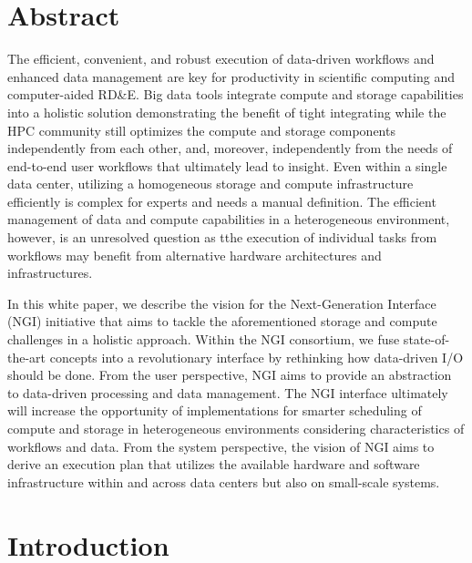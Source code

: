 \documentclass[a4paper, twocolumn]{article}
\title{\papertitle}
\author{Julian M. Kunkel
  \textit{University of Reading}
	\and
  Chris Hoffman
  \textit{National Center for Atmospheric Research}
  \and
  Andy Poling
  \textit{Kove}
  \and
  C
}
\date{\today}
\begin{document}
\maketitle
\thispagestyle{fancy}

\section*{Abstract}

The efficient, convenient, and robust execution of data-driven workflows and enhanced data management are key for productivity in scientific computing and computer-aided RD\&E.
Big data tools integrate compute and storage capabilities into a holistic solution demonstrating the benefit of tight integrating while the HPC community still optimizes the compute and storage components independently from each other, and, moreover, independently from the needs of end-to-end user workflows  that ultimately lead to insight.
Even within a single data center, utilizing a homogeneous storage and compute infrastructure efficiently is complex for experts and needs a manual definition.
The efficient management of data and compute capabilities in a heterogeneous environment, however, is an unresolved question as tthe execution of individual tasks from workflows may benefit from alternative hardware architectures and infrastructures.

In this white paper, we describe the vision for the Next-Generation Interface (NGI) initiative that aims to tackle the aforementioned storage and compute challenges in a holistic approach.
Within the NGI consortium, we fuse state-of-the-art concepts into a revolutionary interface by rethinking how data-driven I/O should be done.
From the user perspective, NGI aims to provide an abstraction to data-driven processing and data management.
The NGI interface ultimately will increase the opportunity of implementations for smarter scheduling of compute and storage in heterogeneous environments considering characteristics of workflows and data.
From the system perspective, the vision of NGI aims to derive an execution plan that utilizes the available hardware and software infrastructure within and across data centers but also on small-scale systems.

\section{Introduction}
\end{document}
